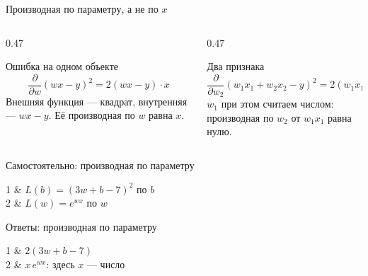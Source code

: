 \begin{frame}[c]{Производная по параметру, а не по $x$}

  \medskip
  \begin{columns}[T]
    \begin{column}{0.47\textwidth}
      \begin{block}{Ошибка на одном объекте}
        \small
        \[\frac{\partial}{\partial w}(w x - y)^2 = 2(wx-y)\cdot x\]
        Внешняя функция --- квадрат, внутренняя --- $wx-y$. Её производная по $w$ равна $x$.
      \end{block}
    \end{column}
    \begin{column}{0.47\textwidth}
      \begin{block}{Два признака}
        \small
        \[\frac{\partial}{\partial w_2}(w_1 x_1 + w_2 x_2 - y)^2 = 2(w_1 x_1 + w_2 x_2 - y)\cdot x_2\]
        $w_1$ при этом считаем числом: производная по $w_2$ от $w_1 x_1$ равна нулю.
      \end{block}
    \end{column}
  \end{columns}
\end{frame}

\begin{frame}[c]{Самостоятельно: производная по параметру}
  \begin{numrows}
    1 & $L(b) = (3w + b - 7)^2$ по $b$\\
    2 & $L(w) = e^{w x}$ по $w$\\
  \end{numrows}
\end{frame}

\begin{frame}[c]{Ответы: производная по параметру}
  \begin{numrows}
    1 & $2(3w + b - 7)$\\
    2 & $x\,e^{wx}$: здесь $x$ --- число\\
  \end{numrows}
\end{frame}
